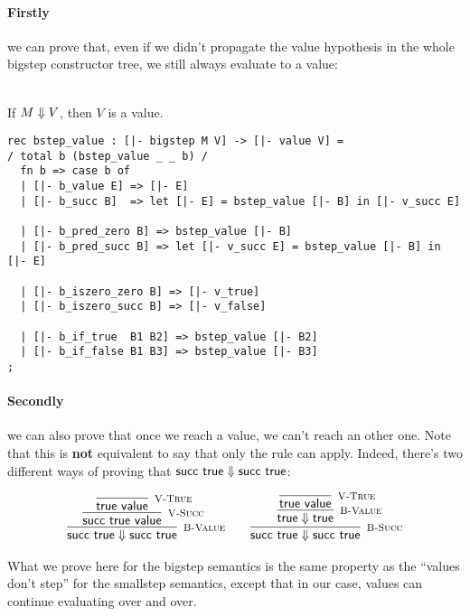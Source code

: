 \paragraph{Firstly} we can prove that, even if we didn't propagate the value
hypothesis in the whole bigstep constructor tree, we still always evaluate to a
value:

\begin{lemma}
  \label{lem:bstep-value-soundness}
  ~\\If $M \Downarrow V$, then $V$ is a value.
\end{lemma}

\begin{lstlisting}
rec bstep_value : [|- bigstep M V] -> [|- value V] =
/ total b (bstep_value _ _ b) /
  fn b => case b of 
  | [|- b_value E] => [|- E]
  | [|- b_succ B]  => let [|- E] = bstep_value [|- B] in [|- v_succ E]

  | [|- b_pred_zero B] => bstep_value [|- B]
  | [|- b_pred_succ B] => let [|- v_succ E] = bstep_value [|- B] in [|- E]

  | [|- b_iszero_zero B] => [|- v_true]
  | [|- b_iszero_succ B] => [|- v_false]

  | [|- b_if_true  B1 B2] => bstep_value [|- B2]
  | [|- b_if_false B1 B3] => bstep_value [|- B3]
;
\end{lstlisting}

\paragraph{Secondly} we can also prove that once we reach a value, we can't
reach an other one. Note that this is {\bf not} equivalent to say that only the
\BValue rule can apply. Indeed, there's two different ways of proving that
$\textsf{succ}~\textsf{true} \Downarrow \textsf{succ}~\textsf{true}$:

\[
\begin{array}{c@{\qquad}c}
  \infer[\BValue]{\tmsucc \tmtrue \BSteps \tmsucc \tmtrue}
  {\infer[\VSucc]{\tmsucc \tmtrue \Value}
    {\infer[\VTrue]{\tmtrue \Value}{}}} &

  \infer[\BSucc]{\tmsucc \tmtrue \BSteps \tmsucc \tmtrue}
  {\infer[\BValue]{\tmtrue \BSteps \tmtrue}
    {\infer[\VTrue]{\tmtrue \Value}{}}}
\end{array}
\]

What we prove here for the bigstep semantics is the same property as the
``values don't step'' for the smallstep semantics, except that in our case,
values can continue evaluating over and over.

